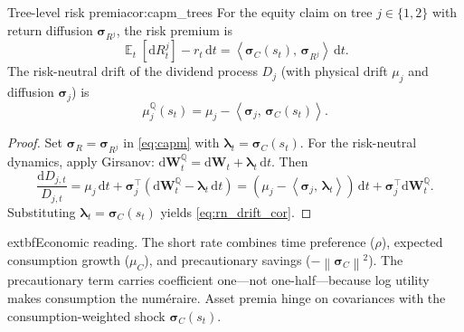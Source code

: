 ﻿\documentclass[11pt,letterpaper,oneside]{article}
\numberwithin{equation}{section}
\DeclareMathOperator{\E}{\mathbb{E}}
\newcommand{\1}{\mathbf{1}}
\newcommand{\diff}{\mathrm{d}}
\newcommand{\norm}[1]{\left\lVert #1\right\rVert}
\newcommand{\ip}[2]{\left\langle #1,\,#2\right\rangle}
\begin{document}
\begin{corollary}{Tree-level risk premia}{cor:capm_trees}
For the equity claim on tree $j\in\{1,2\}$ with return diffusion $\bm{\sigma}_{R^j}$, the risk premium is
\begin{equation}\label{eq:tree_capm}
  \E_t[\diff R^j_t]-r_t\,\diff t=\ip{\bm{\sigma}_C(s_t)}{\bm{\sigma}_{R^j}}\,\diff t.
\end{equation}
The risk-neutral drift of the dividend process $D_j$ (with physical drift $\mu_j$ and diffusion $\bm{\sigma}_j$) is
\begin{equation}\label{eq:rn_drift_cor}
  \mu_j^{\mathbb{Q}}(s_t)=\mu_j-\ip{\bm{\sigma}_j}{\bm{\sigma}_C(s_t)}.
\end{equation}
\end{corollary}
\begin{proof}
Set $\bm{\sigma}_R=\bm{\sigma}_{R^j}$ in \eqref{eq:capm} with $\bm{\lambda}_t=\bm{\sigma}_C(s_t)$. For the risk-neutral dynamics, apply Girsanov: $\diff\bm{W}_t^{\mathbb{Q}}=\diff\bm{W}_t+\bm{\lambda}_t\,\diff t$. Then
\[
  \frac{\diff D_{j,t}}{D_{j,t}}=\mu_j\,\diff t+\bm{\sigma}_j^{\top}(\diff\bm{W}_t^{\mathbb{Q}}-\bm{\lambda}_t\,\diff t)
  = (\mu_j-\ip{\bm{\sigma}_j}{\bm{\lambda}_t})\,\diff t + \bm{\sigma}_j^{\top}\diff\bm{W}_t^{\mathbb{Q}}.
\]
Substituting $\bm{\lambda}_t=\bm{\sigma}_C(s_t)$ yields \eqref{eq:rn_drift_cor}.
\end{proof}

\begin{tcolorbox}[didacticstyle]
  	extbf{Economic reading.} The short rate combines time preference ($\rho$), expected consumption growth ($\mu_C$), and precautionary savings ($-\norm{\bm{\sigma}_C}^2$). The precautionary term carries coefficient one---not one-half---because log utility makes consumption the num\'eraire. Asset premia hinge on covariances with the consumption-weighted shock $\bm{\sigma}_C(s_t)$.
\end{tcolorbox}
\end{document}
